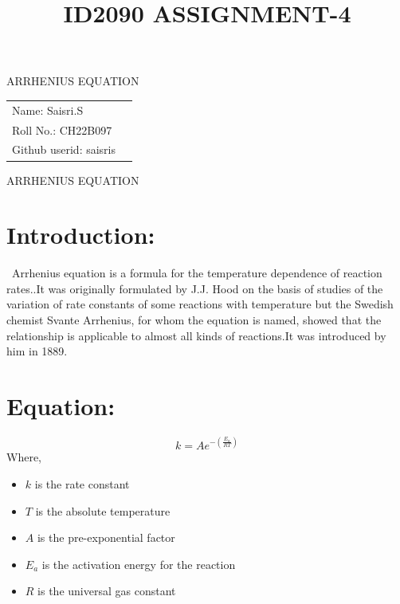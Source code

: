 \documentclass[a4paper]{article}
\title{\Huge \textbf{ID2090 ASSIGNMENT-4}}
\date{}
\begin{document}
\begin{titlingpage}
\maketitle
\centering
\huge ARRHENIUS EQUATION
\thispagestyle{empty} 

\vspace*{\fill}

\begin{flushright}
\Large \begin{tabular}{@{}ll}
Name: Saisri.S \\
Roll No.: CH22B097 \\
Github userid: saisris
\end{tabular}
\end{flushright}
\end{titlingpage}


\newpage
\centering
\Huge ARRHENIUS EQUATION

\vspace{1cm}

\raggedright

\section{\textbf{Introduction:}}
\large



\ Arrhenius equation is a formula for the temperature dependence of reaction rates.\cite{ref=r1}.It was originally formulated by J.J. Hood on the basis of studies of the variation of rate constants of some reactions with temperature but the Swedish chemist Svante Arrhenius, for whom the equation is named, showed that the relationship is applicable to almost all kinds of reactions.It was introduced by him in 1889.


\section{\textbf{Equation:}}
\LARGE
$$k=Ae^{-(\frac{E_a}{RT})}$$
\large
Where,
\begin{itemize}
\item $k$ is the rate constant

\item $T$ is the absolute temperature

\item $A$ is the pre-exponential factor

\item $E_a$ is the activation energy for the reaction

\item $R$ is the universal gas constant

\end{itemize}
\end{document}
